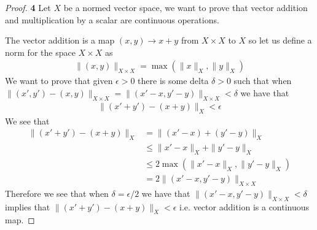 \documentclass[11pt]{article}
\theoremstyle{definition}
\begin{document}
\begin{proof}{\textbf{4}}
    Let $X$ be a normed vector space, we want to prove that vector addition
    and multiplication by a scalar are continuous operations.
    
    The vector addition is a map $(x,y) \to x+y$ from $X \times X$ to $X$ so
    let us define a norm for the space $X \times X$ as 
    \begin{align*}
        \|(x,y)\|_{X\times X} = \max(\|x\|_X, \|y\|_X)
    \end{align*}
    We want to prove that given $\epsilon > 0$ there is some delta $\delta > 0$
    such that when
    $\|(x', y') - (x, y)\|_{X \times X} =
    \|(x'-x, y'-y)\|_{X \times X} < \delta$ we have that
    \begin{align*}
        \|(x' + y') - (x + y)\|_X < \epsilon
    \end{align*}
    We see that
    \begin{align*}
        \|(x' + y') - (x + y)\|_X
            &= \|(x' - x) + (y' - y)\|_X\\
            &\leq \|x' - x\|_X + \|y'- y \|_X\\
            &\leq 2\max(\|x' - x\|_X, \|y' - y\|_X)\\
            &= 2\|(x' - x,y' - y)\|_{X \times X}
    \end{align*}
    Therefore we see that when $\delta = \epsilon/2$ we have that
    $\|(x' - x,y' - y)\|_{X \times X} < \delta$ implies that
    $\|(x' + y') - (x + y)\|_X < \epsilon$ i.e. vector addition is a
    continuous map.


\end{proof}
\end{document}
